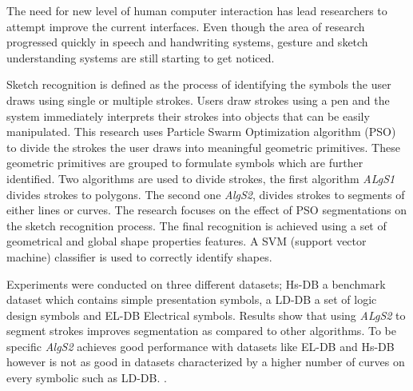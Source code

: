 \documentclass[12pt,onehalfspacing]{SketchThesis}
\begin{document}
\begin{abstractpage}          


The need for new level of human computer interaction has lead researchers to attempt improve the current interfaces. Even though the area of research progressed quickly in speech and handwriting systems, gesture and sketch understanding systems are still starting to get noticed. 


Sketch recognition is defined as the process of identifying the symbols the user draws using single or multiple strokes. Users draw strokes using a pen and the system immediately interprets their strokes into objects that can be easily manipulated. This research uses Particle Swarm Optimization algorithm (PSO) to divide the strokes the user draws into meaningful geometric primitives. These geometric primitives are grouped to formulate symbols which are further identified. Two algorithms are used to divide strokes, the first algorithm \textit{ALgS1} divides strokes to polygons. The second one \textit{AlgS2}, divides strokes to segments of either lines or curves. The research focuses on the effect of PSO segmentations on the sketch recognition process. The final recognition is achieved using a set of geometrical and global shape properties features. A SVM (support vector machine) classifier is used to correctly identify shapes. 

Experiments were conducted on three different datasets; Hs-DB a benchmark dataset which contains simple presentation symbols, a LD-DB a set of logic design symbols and EL-DB Electrical symbols. Results show that using \textit{ALgS2} to segment strokes improves segmentation as compared to other algorithms. To be specific \textit{AlgS2} achieves good performance with datasets like EL-DB and Hs-DB however is not as good in datasets characterized by a higher number of curves on every symbolic such as LD-DB.
. %

\end{abstractpage}                              %
\end{document}
